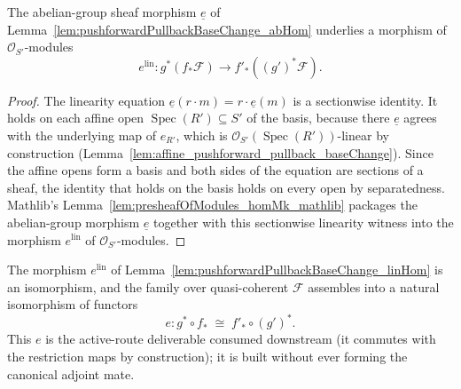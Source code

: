 \begin{lemma}
  \label{lem:pushforwardPullbackBaseChange_linHom}
  The abelian-group sheaf morphism \(\underline{e}\) of
  Lemma~\ref{lem:pushforwardPullbackBaseChange_abHom} underlies a morphism of
  \(\mathcal{O}_{S'}\)-modules
  \[
    e^{\mathrm{lin}} :
    g^*(f_*\mathcal{F}) \longrightarrow f'_*((g')^*\mathcal{F}).
  \]
\end{lemma}

\begin{proof}
  The linearity equation \(\underline{e}(r \cdot m) = r \cdot \underline{e}(m)\) is a
  sectionwise identity. It holds on each affine open
  \(\operatorname{Spec}(R') \subseteq S'\) of the basis, because there \(\underline{e}\)
  agrees with the underlying map of \(e_{R'}\), which is
  \(\mathcal{O}_{S'}(\operatorname{Spec}(R'))\)-linear by construction
  (Lemma~\ref{lem:affine_pushforward_pullback_baseChange}). Since the affine opens form
  a basis and both sides of the equation are sections of a sheaf, the identity that
  holds on the basis holds on every open by separatedness. Mathlib's
  Lemma~\ref{lem:presheafOfModules_homMk_mathlib} packages the abelian-group morphism
  \(\underline{e}\) together with this sectionwise linearity witness into the morphism
  \(e^{\mathrm{lin}}\) of \(\mathcal{O}_{S'}\)-modules.
\end{proof}

\begin{lemma}
  \label{lem:pushforwardPullbackBaseChange_natIso}
  The morphism \(e^{\mathrm{lin}}\) of
  Lemma~\ref{lem:pushforwardPullbackBaseChange_linHom} is an isomorphism, and the
  family over quasi-coherent \(\mathcal{F}\) assembles into a natural isomorphism of
  functors
  \[
    e : g^* \circ f_* \;\cong\; f'_* \circ (g')^* .
  \]
  This \(e\) is the active-route deliverable consumed downstream (it commutes with the
  restriction maps by construction); it is built without ever forming the canonical
  adjoint mate.
\end{lemma}

